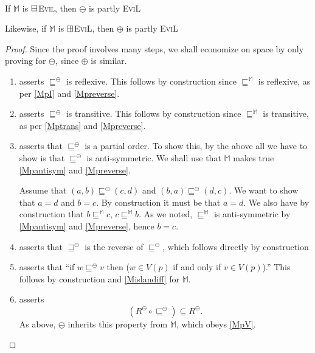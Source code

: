 \begin{lemma}[$\BM/\BP$ Completion]\label{bm-bp completion}\ \\
If $\mathbb{M}$ is $\boxminus$\textsc{Evil}, then $\ominus$ is
partly \textsc{EviL}

Likewise, if $\mathbb{M}$ is $\boxplus$\textsc{EviL}, then $\oplus$ is
partly \textsc{EviL}
\end{lemma}
\begin{proof}
Since the proof involves many steps, we shall economize on space by
only proving for $\ominus$, since $\oplus$ is similar.
\begin{enumerate}[label=\textup{(\emph{\Roman*})$'$}, topsep=0.0in,
  parsep=0.075in]
\item asserts $\sqsubseteq^\ominus$ is reflexive.  This follows by
  construction since $\sqsubseteq^\mathbb{M}$ is reflexive, as per
  \ref{MpI} and \ref{Mpreverse}.
\item asserts $\sqsubseteq^\ominus$ is transitive.  This follows by
  construction since $\sqsubseteq^\mathbb{M}$ is transitive, as per
  \ref{Mptrans} and \ref{Mpreverse}.
\item asserts that $\sqsubseteq^\ominus$ is a partial order. To show
  this, by the above all we have to show is that $\sqsubseteq^\ominus$ is anti-symmetric.  
  We shall use that $\mathbb{M}$ makes true \ref{Mpantisym} and \ref{Mpreverse}. 
  
  Assume that $(a,b) \sqsubseteq^{\ominus} (c,d)$ and $(b,a)
  \sqsubseteq^{\ominus} (d,c)$.  We want to show that $a =d$ and $b
  =c$.    By construction it must be that $a = d$.  
  We also have by construction that $b \sqsubseteq^{\mathbb{M}} c$, $c
  \sqsubseteq^{\mathbb{M}} b$.  
  As we noted, $\sqsubseteq^{\mathbb{M} }$ is anti-symmetric by \ref{Mpantisym} and \ref{Mpreverse}, 
  hence $b = c$. 
\item asserts that $\sqsupseteq^\ominus$ is the reverse of
  $\sqsubseteq^\ominus$, which follows directly by construction
\item asserts that ``if $w \sqsubseteq^\ominus v$ then ($w \in V (p)$
  if and only if $v \in V (p)$).''  This follows by construction and
  \ref{Mislandiff} for $\mathbb{M}$.
\item asserts  \[(R^{\ominus} \circ \sqsubseteq^{\ominus}) \subseteq
    R^{\ominus}.\]
As above, $\ominus$ inherits this property from $\mathbb{M}$, which
obeys \ref{MpV}.


\end{enumerate}
\end{proof}
